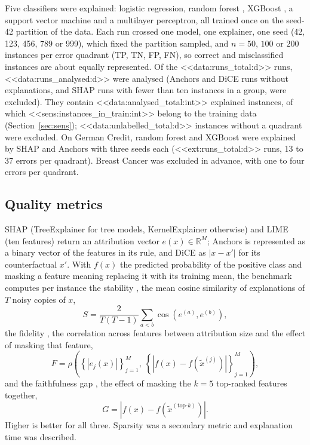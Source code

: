 \documentclass[12pt,letterpaper]{article}
\begin{document}
Five classifiers were explained: logistic regression, random forest
\cite{breiman2001random}, XGBoost \cite{chen2016xgboost}, a support vector machine and a
multilayer perceptron, all trained once on the seed-42 partition of the data. Each run
crossed one model, one explainer, one seed (42, 123, 456, 789 or 999), which fixed the
partition sampled, and $n = 50$, $100$ or $200$ instances per error quadrant (TP, TN, FP,
FN), so correct and misclassified instances are about equally represented. Of the
<<data:runs_total:d>> runs, <<data:runs_analysed:d>> were analysed (Anchors and DiCE runs
without explanations, and SHAP runs with fewer than ten instances in a group, were
excluded). They contain <<data:analysed_total:int>> explained instances, of which
<<sens:instances_in_train:int>> belong to the training data (Section~\ref{sec:sens});
<<data:unlabelled_total:d>> instances without a quadrant were excluded. On German Credit, random
forest and XGBoost were explained by SHAP and Anchors with three seeds each (<<ext:runs_total:d>> runs, 13 to
37 errors per quadrant). Breast Cancer was excluded in advance, with one to four errors
per quadrant.

\subsection{Quality metrics}

SHAP (TreeExplainer for tree models, KernelExplainer otherwise) and LIME (ten features)
return an attribution vector $e(x) \in \mathbb{R}^{M}$; Anchors is represented as a binary
vector of the features in its rule, and DiCE as $|x - x'|$ for its counterfactual $x'$.
With $f(x)$ the predicted probability of the positive class and masking a feature meaning
replacing it with its training mean, the benchmark \cite{herrera2026framework} computes
per instance the stability \cite{alvarezmelis2018robustness}, the mean cosine similarity of
explanations of $T$ noisy copies of $x$,
\begin{equation}
S = \frac{2}{T(T-1)} \sum_{a<b} \cos\left(e^{(a)}, e^{(b)}\right),
\end{equation}
the fidelity \cite{bhatt2020evaluating}, the correlation across features between
attribution size and the effect of masking that feature,
\begin{equation}
F = \rho\left( \left\{ |e_j(x)| \right\}_{j=1}^{M},\ \left\{ |f(x) - f(\tilde{x}^{(j)})| \right\}_{j=1}^{M} \right),
\end{equation}
and the faithfulness gap \cite{samek2017evaluating,hooker2019benchmark}, the effect of
masking the $k = 5$ top-ranked features together,
\begin{equation}
G = \left| f(x) - f\left(\tilde{x}^{(\text{top-}k)}\right) \right|.
\end{equation}
Higher is better for all three. Sparsity was a secondary metric and explanation time was
described.
\end{document}
